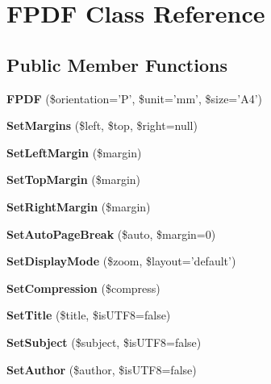 \section{F\+P\+D\+F Class Reference}
\label{class_f_p_d_f}
\subsection*{Public Member Functions}
\begin{DoxyCompactItemize}
\item 
{\bfseries F\+P\+D\+F} (\$orientation='P', \$unit='mm', \$size='A4')\label{class_f_p_d_f_ae8c90f72b7efb5bc6d9bafda0689ea36}

\item 
{\bfseries Set\+Margins} (\$left, \$top, \$right=null)\label{class_f_p_d_f_ad56bcdc517c73590acc9b46ea07df54d}

\item 
{\bfseries Set\+Left\+Margin} (\$margin)\label{class_f_p_d_f_a4a873f55447a71303ce1958c59a98789}

\item 
{\bfseries Set\+Top\+Margin} (\$margin)\label{class_f_p_d_f_a22dda679718f538c49e955e555ab0a9a}

\item 
{\bfseries Set\+Right\+Margin} (\$margin)\label{class_f_p_d_f_a7f452e4166f36a72906775a40c15e407}

\item 
{\bfseries Set\+Auto\+Page\+Break} (\$auto, \$margin=0)\label{class_f_p_d_f_a0b1468e198e5b9c70849884a76d178e2}

\item 
{\bfseries Set\+Display\+Mode} (\$zoom, \$layout='default')\label{class_f_p_d_f_adf35460d37337a0230bb08629c120d79}

\item 
{\bfseries Set\+Compression} (\$compress)\label{class_f_p_d_f_ae16f74f4f495c81b144b73d468b34b14}

\item 
{\bfseries Set\+Title} (\$title, \$is\+U\+T\+F8=false)\label{class_f_p_d_f_a80e45ebc65d0f0f5d7561cd9d4e07d2a}

\item 
{\bfseries Set\+Subject} (\$subject, \$is\+U\+T\+F8=false)\label{class_f_p_d_f_a46113100b89d952a09025804d0ccfcd4}

\item 
{\bfseries Set\+Author} (\$author, \$is\+U\+T\+F8=false)\label{class_f_p_d_f_a905fdb373900fd1b96d6e1cd6c26a764}


\end{DoxyCompactItemize}

